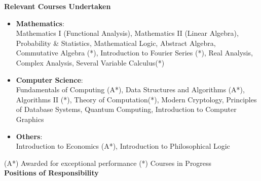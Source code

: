 \documentclass[letterpaper,11pt]{article}
\begin{document}
{\vspace{-1pt}
\Large{\textbf{Relevant Courses Undertaken}}
\small
\vspace{-5pt}
\begin{itemize}
    \item \textbf{Mathematics}:\\
        Mathematics I (Functional Analysis), Mathematics II (Linear Algebra), Probability \& Statistics, Mathematical Logic, Abstract Algebra, Commutative Algebra (*), Introduction to Fourier Series (*), Real Analysis, Complex Analysis, Several Variable Calculus(*)\\
    \vspace{-2pt}
    \item \textbf{Computer Science}:\\
        Fundamentals of Computing (A*), Data Structures and Algorithms (A*), Algorithms II (*), Theory of Computation(*), Modern Cryptology, Principles of Database Systems, Quantum Computing, Introduction to Computer Graphics\\
    \vspace{-2pt}
    \item \textbf{Others}:\\
        Introduction to Economics (A*), Introduction to Philosophical Logic\\
    \vspace{-2pt}
\end{itemize}
\footnotesize{\hspace*{0.5in}(A*) Awarded for exceptional performance
\hspace{1.5in}  (*) Courses in Progress\\
\vspace{4pt}
\Large{\textbf{Positions of Responsibility}}
\small
\vspace{-5pt}

}}
\end{document}

